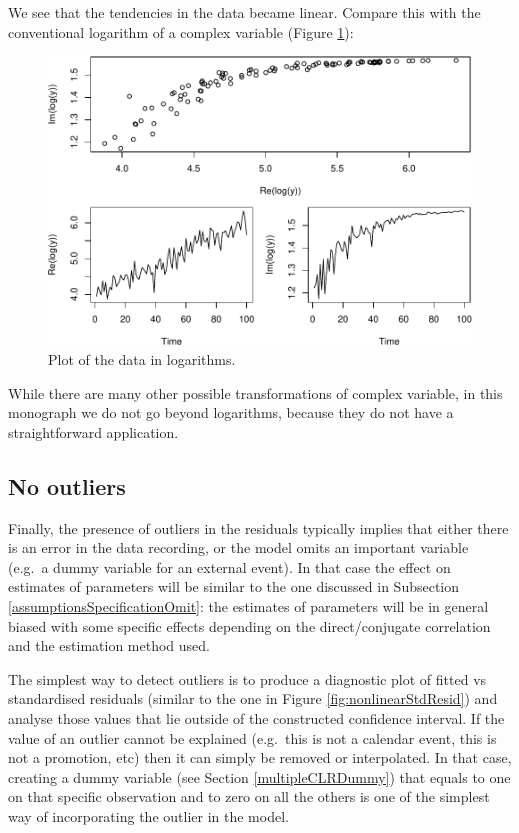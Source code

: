 \documentclass[
]{book}
\begin{document}
We see that the tendencies in the data became linear. Compare this with the conventional logarithm of a complex variable (Figure \ref{fig:nonlinearDataLog}):

\begin{figure}
\centering
\includegraphics{Svetunkov---Svetunkov---Complex-Valued-Econometrics_files/figure-latex/nonlinearDataLog-1.pdf}
\caption{\label{fig:nonlinearDataLog}Plot of the data in logarithms.}
\end{figure}

While there are many other possible transformations of complex variable, in this monograph we do not go beyond logarithms, because they do not have a straightforward application.

\hypertarget{assumptionsSpecificationOutlier}{%
\subsection{No outliers}\label{assumptionsSpecificationOutlier}}

Finally, the presence of outliers in the residuals typically implies that either there is an error in the data recording, or the model omits an important variable (e.g.~a dummy variable for an external event). In that case the effect on estimates of parameters will be similar to the one discussed in Subsection \ref{assumptionsSpecificationOmit}: the estimates of parameters will be in general biased with some specific effects depending on the direct/conjugate correlation and the estimation method used.

The simplest way to detect outliers is to produce a diagnostic plot of fitted vs standardised residuals (similar to the one in Figure \ref{fig:nonlinearStdResid}) and analyse those values that lie outside of the constructed confidence interval. If the value of an outlier cannot be explained (e.g.~this is not a calendar event, this is not a promotion, etc) then it can simply be removed or interpolated. In that case, creating a dummy variable (see Section \ref{multipleCLRDummy}) that equals to one on that specific observation and to zero on all the others is one of the simplest way of incorporating the outlier in the model.
\end{document}
